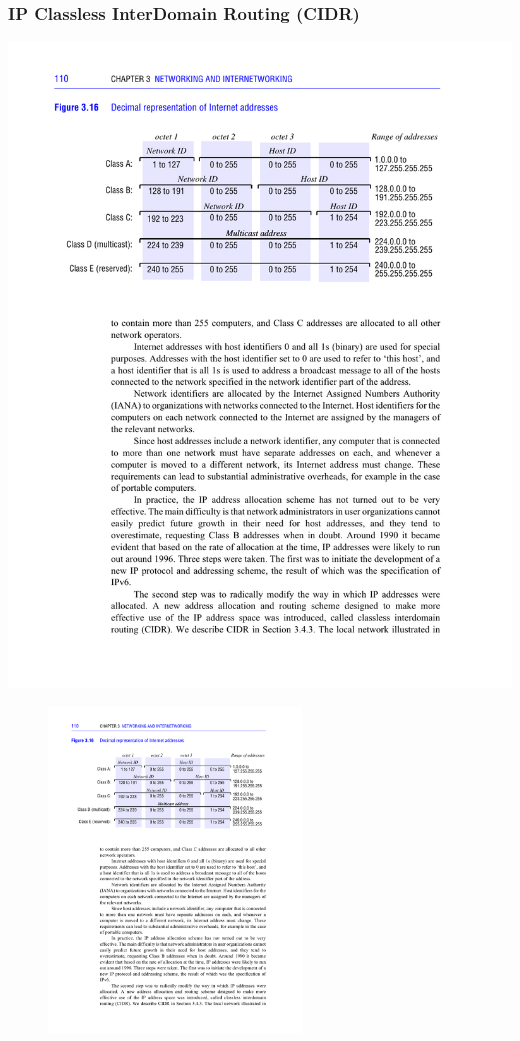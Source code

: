 \documentclass[xcolor=dvipsnames,10pt,compress,aspectratio=169]{beamer}
\begin{document}
\begin{frame}
  \frametitle{IP Classless InterDomain Routing (CIDR)}
{
  \includegraphics[width=\textwidth]{coulouris-03-16}
}
{
  \begin{figure}[ht]
  \centering
  \includegraphics[width=0.6\textwidth]{coulouris-03-16}
  \end{figure}
}
\end{frame}
\end{document}
